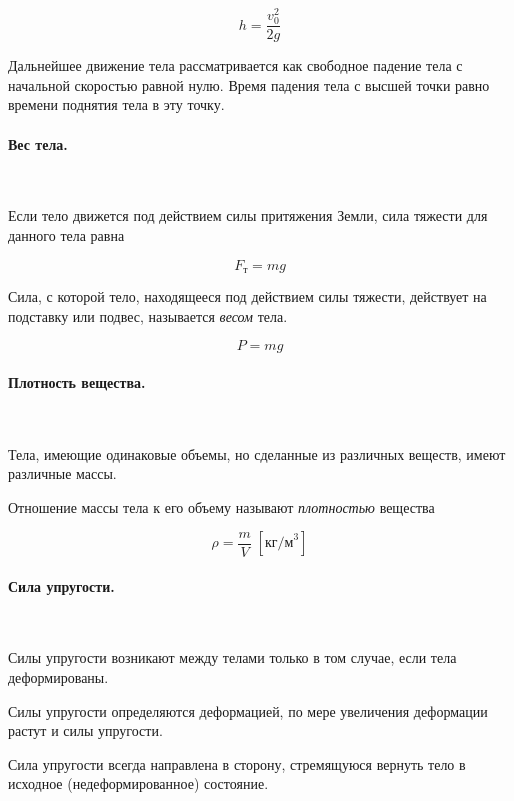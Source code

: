 \documentclass[a4paper,12pt]{article}
\begin{document}
		\begin{equation}
			h = \frac{v_0^2}{2g}
		\end{equation}

		Дальнейшее движение тела рассматривается как свободное падение 
		тела с начальной скоростью равной нулю.
		Время падения тела с высшей точки равно времени поднятия тела
		в эту точку.


		\paragraph{Вес тела.} \

		Если тело движется под действием силы притяжения Земли,
		сила тяжести для данного тела равна

		\begin{equation}
			F_\text{т} = mg
		\end{equation}

		Сила, с которой тело, находящееся под действием силы тяжести,
		действует на подставку или подвес, называется \textit{весом}
		тела.

		\begin{equation}
			P = mg
		\end{equation}


		\paragraph{Плотность вещества.} \

		Тела, имеющие одинаковые объемы, но сделанные из различных
		веществ, имеют различные массы.

		Отношение массы тела к его объему называют \textit{плотностью}
		вещества

		\begin{equation}
			\rho = \frac{m}{V} \; [\text{кг/м}^3]
		\end{equation}



		\paragraph{Сила упругости.} \

		Силы упругости возникают между телами только в том случае, если
		тела деформированы.

		Силы упругости определяются деформацией, по мере увеличения
		деформации растут и силы упругости.

		Сила упругости всегда направлена в сторону, стремящуюся вернуть 
		тело в исходное (недеформированное) состояние.
\end{document}

